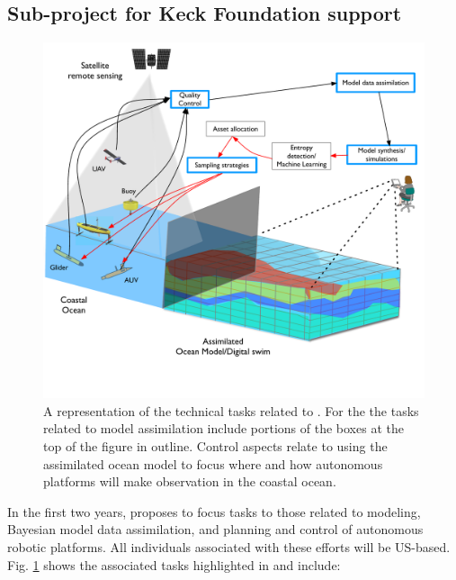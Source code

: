 \subsection{Sub-project for Keck Foundation support}

\begin{figure}[h!]
  \centering
  \includegraphics[scale=0.6]{fig/Audacious-pilot-block-diag-2.pdf}
  \caption{A representation of the technical tasks related to \proe. For
    the \kck the tasks related to model assimilation include portions of
    the boxes at the top of the figure in {\color{blue}{blue}}
    outline. Control aspects relate to using the assimilated ocean model
    to focus where and how autonomous platforms will make observation in
    the coastal ocean.}
    \label{fig:block-diag}
\end{figure}

In the first two years, \pro proposes to focus tasks to those related
to modeling, Bayesian model data assimilation, and planning and
control of autonomous robotic platforms. All individuals associated
with these efforts will be US-based.  Fig. \ref{fig:block-diag} shows
the associated tasks highlighted in {\color{blue}{blue}} and include:

